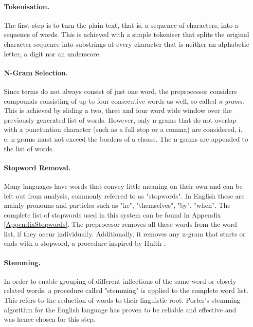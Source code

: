 \documentclass[11pt,a4paper,twoside]{article}
\begin{document}
\paragraph{Tokenisation.} The first step is to turn the plain text, that is, a sequence of characters, into a sequence of words. This is achieved with a simple tokeniser that splits the original character sequence into substrings at every character that is neither an alphabetic letter, a digit nor an underscore. 

\paragraph{N-Gram Selection.} Since terms do not always consist of just one word, the preprocessor considers compounds consisting of up to four consecutive words as well, so called \emph{n-grams}. This is achieved by sliding a two, three and four word wide window over the previously generated list of words. However, only n-grams that do not overlap with a punctuation character (such as a full stop or a comma) are considered, i. e. n-grams must not exceed the borders of a clause. The n-grams are appended to the list of words.

\paragraph{Stopword Removal.} Many languages have words that convey little meaning on their own and can be left out from analysis, commonly referred to as "stopwords". In English these are mainly pronouns and particles such as "he", "themselves", "by", "when". The complete list of stopwords used in this system can be found in Appendix \ref{AppendixStopwords}. The preprocesor removes all these words from the word list, if they occur individually. Additionally, it removes any n-gram that starts or ends with a stopword, a procedure inspired by Hulth \cite{Hulth2003ImprovedKnowledge}.

\paragraph{Stemming.} In order to enable grouping of different inflections of the same word or closely related words, a procedure called "stemming" is applied to the complete word list. This refers to the reduction of words to their linguistic root. Porter's stemming algorithm \cite{Porter1980AnStripping} for the English language has proven to be reliable and effective and was hence chosen for this step.
\end{document}
